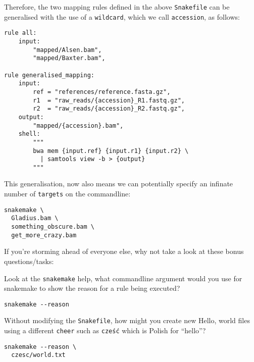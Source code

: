 Therefore, the two mapping rules defined in the above \texttt{Snakefile} can be generalised with the use of a \texttt{wildcard}, which we
call \texttt{accession}, as follows:

\begin{lstlisting}
rule all:
	input:
		"mapped/Alsen.bam",
		"mapped/Baxter.bam",

rule generalised_mapping:
	input:
		ref = "references/reference.fasta.gz",
		r1  = "raw_reads/{accession}_R1.fastq.gz",
		r2  = "raw_reads/{accession}_R2.fastq.gz",
	output:
		"mapped/{accession}.bam",
	shell:
		"""
		bwa mem {input.ref} {input.r1} {input.r2} \
		  | samtools view -b > {output}
		"""
\end{lstlisting}

This generalisation, now also means we can potentially specify an infinate number of \texttt{targets} on the commandline:

\begin{lstlisting}
snakemake \
  Gladius.bam \
  something_obscure.bam \
  get_more_crazy.bam
\end{lstlisting}






\begin{bonus}

If you're storming ahead of everyone else, why not take a look at these bonus questions/tasks:

\begin{questions}
Look at the \texttt{snakemake} help, what commandline argument would you use for snakemake to show the reason for
a rule being executed?
\end{questions}

\begin{answer}
\begin{lstlisting}
snakemake --reason
\end{lstlisting}
\end{answer}

\begin{questions}
Without modifying the \texttt{Snakefile}, how might you create new Hello, world files using a different \texttt{cheer} such as
\texttt{cześć} which is Polish for ``hello''?
\end{questions}

\begin{answer}
\begin{lstlisting}
snakemake --reason \
  czesc/world.txt
\end{lstlisting}
\end{answer}

\end{bonus}


